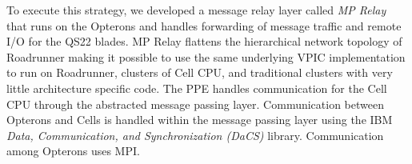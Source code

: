 \documentclass[letter,10pt]{article}
\begin{document}





To execute this strategy, we developed a message relay layer called
\emph{MP Relay} that runs on the Opterons and handles forwarding of
message traffic and remote I/O for the QS22 blades.  
MP Relay flattens the hierarchical network
topology of Roadrunner making it possible to use the same underlying
VPIC implementation to run on Roadrunner, clusters of Cell CPU, and
traditional clusters with very little architecture specific code.  The
PPE handles communication for the Cell CPU through the abstracted
message passing layer.  Communication between Opterons and Cells is
handled within the message passing layer using the IBM \emph{Data,
Communication, and Synchronization (DaCS)} library. 
Communication among Opterons uses MPI.

\end{document}
